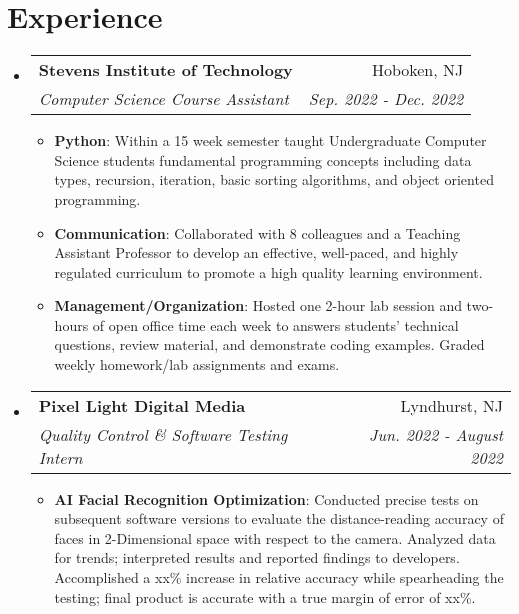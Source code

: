 \documentclass[letterpaper,11pt]{article}
\makeatletter
\newcommand{\resumeItem}[2]{
  \item\small{
    \textbf{#1}{: #2 \vspace{-2pt}}
  }
}
\newcommand{\resumeSubheading}[4]{
  \vspace{-1pt}\item
    \begin{tabular*}{0.97\textwidth}{l@{\extracolsep{\fill}}r}
      \textbf{#1} & #2 \\
      \textit{\small#3} & \textit{\small #4} \\
    \end{tabular*}\vspace{-5pt}
}
\newcommand{\resumeItemListStart}{\begin{itemize}}
\newcommand{\resumeItemListEnd}{\end{itemize}\vspace{-5pt}}
\makeatother
\begin{document}
\section{Experience}
  \begin{itemize}[leftmargin=*]

    \resumeSubheading
      {Stevens Institute of Technology}{Hoboken, NJ}
      {Computer Science Course Assistant}{Sep. 2022 - Dec. 2022}
      \resumeItemListStart
        \resumeItem{Python}
        {Within a 15 week semester taught Undergraduate Computer Science students fundamental programming concepts including data types, recursion, iteration, basic sorting algorithms, and object oriented programming.}
        \resumeItem{Communication}
        {Collaborated with 8 colleagues and a Teaching Assistant Professor to develop an effective, well-paced, and highly regulated curriculum to promote a high quality learning environment.}
        \resumeItem{Management/Organization}
        {Hosted one 2-hour lab session and two-hours of open office time each week to answers students' technical questions, review material, and demonstrate coding examples. Graded weekly homework/lab assignments and exams.}
      \resumeItemListEnd

    \resumeSubheading
      {Pixel Light Digital Media}{Lyndhurst, NJ}
      {Quality Control \& Software Testing Intern}{Jun. 2022 - August 2022}
      \resumeItemListStart
            \resumeItem{AI Facial Recognition Optimization}
            {Conducted precise tests on subsequent software versions to evaluate the distance-reading accuracy of faces in 2-Dimensional space with respect to the camera. Analyzed data for trends; interpreted results and reported findings to developers. Accomplished a xx\% increase in relative accuracy while spearheading the testing; final product is accurate with a true margin of error of xx\%.}
      \resumeItemListEnd
      
  \end{itemize}


\end{document}
